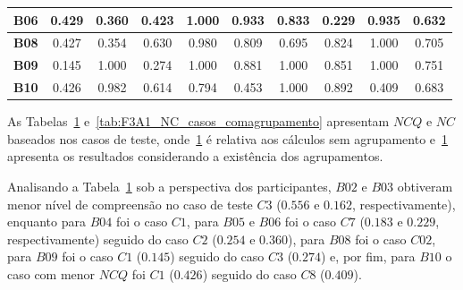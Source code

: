 \begin{table}[htbp]
\begin{tabular}{|c|ccccccccc|}
		\textbf{B06} & \multicolumn{1}{c|}{0.429} & \multicolumn{1}{c|}{0.360} & \multicolumn{1}{c|}{0.423} & \multicolumn{1}{c|}{1.000} & \multicolumn{1}{c|}{0.933} & \multicolumn{1}{c|}{0.833} & \multicolumn{1}{c|}{0.229} & \multicolumn{1}{c|}{0.935} & 0.632 \\ \hline
		\rowcolor[HTML]{F2F2F2} 
		\textbf{B08} & \multicolumn{1}{c|}{\cellcolor[HTML]{F2F2F2}0.427} & \multicolumn{1}{c|}{\cellcolor[HTML]{F2F2F2}0.354} & \multicolumn{1}{c|}{\cellcolor[HTML]{F2F2F2}0.630} & \multicolumn{1}{c|}{\cellcolor[HTML]{F2F2F2}0.980} & \multicolumn{1}{c|}{\cellcolor[HTML]{F2F2F2}0.809} & \multicolumn{1}{c|}{\cellcolor[HTML]{F2F2F2}0.695} & \multicolumn{1}{c|}{\cellcolor[HTML]{F2F2F2}0.824} & \multicolumn{1}{c|}{\cellcolor[HTML]{F2F2F2}1.000} & 0.705 \\ \hline
		\textbf{B09} & \multicolumn{1}{c|}{0.145} & \multicolumn{1}{c|}{1.000} & \multicolumn{1}{c|}{0.274} & \multicolumn{1}{c|}{1.000} & \multicolumn{1}{c|}{0.881} & \multicolumn{1}{c|}{1.000} & \multicolumn{1}{c|}{0.851} & \multicolumn{1}{c|}{1.000} & 0.751 \\ \hline
		\rowcolor[HTML]{F2F2F2} 
		\textbf{B10} & \multicolumn{1}{c|}{\cellcolor[HTML]{F2F2F2}0.426} & \multicolumn{1}{c|}{\cellcolor[HTML]{F2F2F2}0.982} & \multicolumn{1}{c|}{\cellcolor[HTML]{F2F2F2}0.614} & \multicolumn{1}{c|}{\cellcolor[HTML]{F2F2F2}0.794} & \multicolumn{1}{c|}{\cellcolor[HTML]{F2F2F2}0.453} & \multicolumn{1}{c|}{\cellcolor[HTML]{F2F2F2}1.000} & \multicolumn{1}{c|}{\cellcolor[HTML]{F2F2F2}0.892} & \multicolumn{1}{c|}{\cellcolor[HTML]{F2F2F2}0.409} & 0.683 \\ \hline
	\end{tabular}
	\label{tab:F3A1_NC_casos_semagrupamento}
\end{table}

As Tabelas~\ref{tab:F3A1_NC_casos_semagrupamento} e~\ref{tab:F3A1_NC_casos_comagrupamento} apresentam $NCQ$ e $NC$ baseados nos casos de teste, onde~\ref{tab:F3A1_NC_casos_semagrupamento} é relativa aos cálculos sem agrupamento e~\ref{tab:F3A1_NC_casos_semagrupamento} apresenta os resultados considerando a existência dos agrupamentos.

Analisando a Tabela~\ref{tab:F3A1_NC_casos_semagrupamento} sob a perspectiva dos participantes, $B02$ e $B03$ obtiveram menor nível de compreensão no caso de teste $C3$ ($0.556$ e $0.162$, respectivamente), enquanto para $B04$ foi o caso $C1$, para $B05$ e $B06$ foi o caso $C7$ ($0.183$ e $0.229$, respectivamente) seguido do caso $C2$ ($0.254$ e $0.360$), para $B08$ foi o caso $C02$, para $B09$ foi o caso $C1$ ($0.145$) seguido do caso $C3$ ($0.274$) e, por fim, para $B10$ o caso com menor $NCQ$ foi $C1$ ($0.426$) seguido do caso $C8$ ($0.409$).

